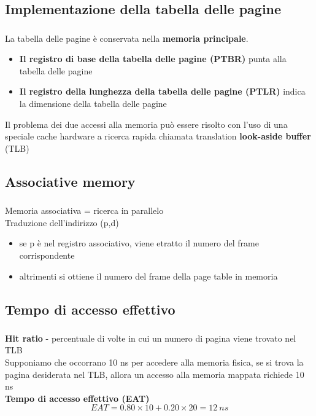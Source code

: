 \documentclass{beamer}
\newenvironment{mainframe}{
	\begin{frame}
		\frametitle{\insertsubsection}
		\framesubtitle{\insertsection}
	}{
	\end{frame}
}
\begin{document}
\subsection{Implementazione della tabella delle pagine}
\begin{mainframe}
	La tabella delle pagine è conservata nella \textbf{memoria principale}.\\
	\begin{itemize}
		\item \textbf{Il registro di base della tabella delle pagine (PTBR)} punta alla tabella delle pagine
		\item \textbf{Il registro della lunghezza della tabella delle pagine (PTLR)} indica la dimensione della tabella delle pagine
	\end{itemize}
	Il problema dei due accessi alla memoria può essere risolto con l'uso di una speciale cache hardware a ricerca rapida chiamata translation \textbf{look-aside buffer} (TLB)
\end{mainframe}
\subsection{Associative memory}
\begin{mainframe}
	Memoria associativa = ricerca in parallelo\\
	Traduzione dell'indirizzo (p,d)
	\begin{itemize}
		\item se p è nel registro associativo, viene etratto il numero del frame corrispondente
		\item altrimenti si ottiene il numero del frame della page table in memoria
	\end{itemize}
\end{mainframe}
\subsection{Tempo di accesso effettivo}
\begin{mainframe}
	\textbf{Hit ratio} - percentuale di volte in cui un numero di pagina viene trovato nel TLB\\
	Supponiamo che occorrano 10 ns per accedere alla memoria fisica, se si trova la pagina desiderata nel TLB, allora un accesso alla memoria mappata richiede 10 ns\\
	\textbf{Tempo di accesso effettivo (EAT)} $$EAT = 0.80 \times 10 + 0.20 \times 20 = 12 \ ns$$
	\end{mainframe}
\end{document}

